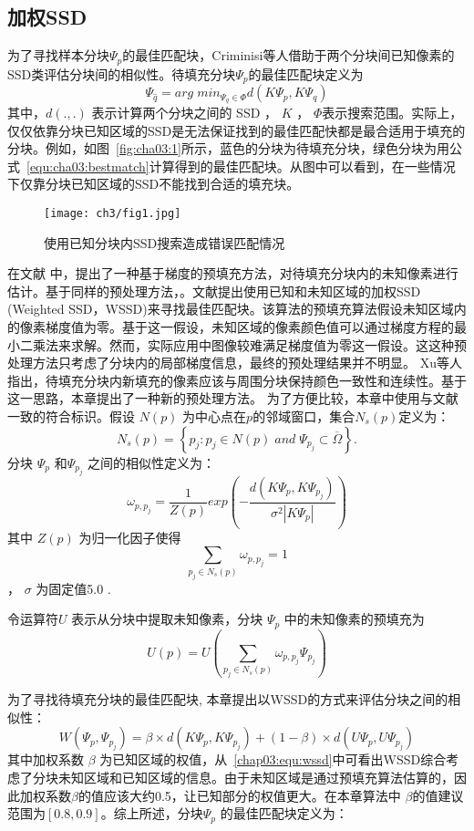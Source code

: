  \subsection{加权SSD}
 \label{sec:sub:WSSD}
 为了寻找样本分块\(\Psi_p\)的最佳匹配块，Criminisi等人\cite{Criminisi04regionfilling}借助于两个分块间已知像素的SSD类评估分块间的相似性。待填充分块\(\Psi_p\)的最佳匹配块定义为
 \begin{equation}
 \label{equ:cha03:bestmatch}
 \Psi_{\hat{q}}=arg\;min_{\Psi_q\in\Phi}d(K\Psi_p,K\Psi_q)
 \end{equation}
 其中，\(d(.,.)\) 表示计算两个分块之间的 SSD ， \(K\) ， \(\Phi\)表示搜索范围。实际上，仅仅依靠分块已知区域的SSD是无法保证找到的最佳匹配快都是最合适用于填充的分块。例如，如图~\ref{fig:cha03:1}所示，蓝色的分块为待填充分块，绿色分块为用公式~\ref{equ:cha03:bestmatch}计算得到的最佳匹配块。从图中可以看到，在一些情况下仅靠分块已知区域的SSD不能找到合适的填充块。
 \begin{figure}[!htbp]
 	\begin{center}
 			\texttt{[image: ch3/fig1.jpg]}
 	\end{center}
     \caption{使用已知分块内SSD搜索造成错误匹配情况}
 	\label{cha03:fig:1}
 \end{figure}
 在文献 中，提出了一种基于梯度的预填充方法，对待填充分块内的未知像素进行估计。基于同样的预处理方法，。文献提出使用已知和未知区域的加权SSD (Weighted SSD，WSSD)来寻找最佳匹配块。该算法的预填充算法假设未知区域内的像素梯度值为零。基于这一假设，未知区域的像素颜色值可以通过梯度方程的最小二乘法来求解。然而，实际应用中图像较难满足梯度值为零这一假设。这这种预处理方法只考虑了分块内的局部梯度信息，最终的预处理结果并不明显。 Xu等人\cite{Xu:2010}指出，待填充分块内新填充的像素应该与周围分块保持颜色一致性和连续性。基于这一思路，本章提出了一种新的预处理方法。
 为了方便比较，本章中使用与文献一致的符合标识。假设 \(N(p)\) 为中心点在\(p\)的邻域窗口，集合\(N_s(p)\)定义为：
 $$N_s(p)= \left\{ p_j:p_j \in N(p)\;and\;\Psi_{p_j} \subset \overline{\Omega} \right\}.$$
 分块 \(\Psi_p\) 和\(\Psi_{p_j}\)  之间的相似性定义为：
 $$\omega_{p,p_{j}}=\frac{1}{Z(p)}exp\left(-\frac{d(K\Psi_p,K\Psi_{p_j})}{\sigma^2\left|K\Psi_p\right|}\right)$$
 其中 \(Z(p)\) 为归一化因子使得 $$\sum_{p_j\in N_s(p)}\omega_{p,p_j} = 1$$ ， \(\sigma\) 为固定值5.0 \cite{Xu:2010}.\par
 令运算符\(U\) 表示从分块中提取未知像素，分块 \(\Psi_p\) 中的未知像素的预填充为
 $$U(p)=U\left(\sum_{p_j \in N_s(p)}{\omega_{p,p_j}\Psi_{p_j}}\right)$$\par
 为了寻找待填充分块的最佳匹配块, 本章提出以WSSD的方式来评估分块之间的相似性：
 \begin{equation}
 W(\Psi_p,\Psi_{p_j})=\beta\times d(K\Psi_p,K\Psi_{p_j})+(1-\beta)\times d(U\Psi_p,U\Psi_{p_j})
 \label{chap03:equ:wssd}
 \end{equation}
 其中加权系数 \(\beta\) 为已知区域的权值，从~\ref{chap03:equ:wssd}中可看出WSSD综合考虑了分块未知区域和已知区域的信息。由于未知区域是通过预填充算法估算的，因此加权系数\(\beta\)的值应该大约0.5，让已知部分的权值更大。在本章算法中 \(\beta\)的值建议范围为$[0.8, 0.9]$。综上所述，分块\(\Psi_p\) 的最佳匹配块定义为：

